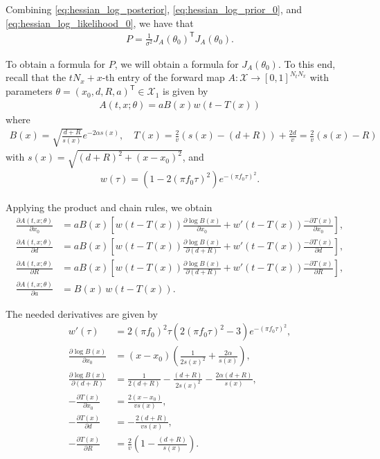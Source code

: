 \documentclass{homework}
\begin{document}
\begin{enumerate}
    Combining \eqref{eq:hessian_log_posterior}, \eqref{eq:hessian_log_prior_0}, and \eqref{eq:hessian_log_likelihood_0}, we have that
    \begin{align}
    P
    =
    \frac{1}{\sigma^2}J_A(\theta_0)^{\mathsf T}J_A(\theta_0). \label{eq:hessian_log_posterior_0}
    \end{align}

    To obtain a formula for \(P\), we will obtain a formula for $J_A(\theta_0)$. 
    To this end, recall that the $t N_x + x$-th entry of the forward map $A: \mathcal{X} \to [0, 1]^{N_t N_x}$ 
    with parameters $\theta=(x_0, d, R, a)^{\mathsf T} \in \mathcal{X}_1$ is given by 
    \begin{align*}
    A(t, x; \theta) = aB(x)w(t-T(x))
    \end{align*}
    where
    \begin{align*}
    B(x) = \sqrt{\frac{d+R}{s(x)}} e^{-2\alpha s(x)}, \quad T(x) = \frac{2}{v} (s(x) - (d+R)) + \frac{2d}{v} = \frac{2}{v} (s(x) - R)
    \end{align*}
    with $s(x) = \sqrt{(d+R)^2+(x-x_0)^2}$,
    and 
    \begin{align*}
    w(\tau) = (1-2(\pi f_0\tau)^2)e^{-(\pi f_0\tau)^2}.
    \end{align*}

    Applying the product and chain rules, we obtain
    \begin{equation}
    \begin{aligned}
    \frac{\partial A(t,x;\theta)}{\partial x_0}&=aB(x)\left[w(t-T(x))\frac{\partial\log B(x)}{\partial x_0}+w'(t-T(x))\frac{-\partial T(x)}{\partial x_0}\right],\\
    \frac{\partial A(t,x;\theta)}{\partial d}&=aB(x)\left[w(t-T(x))\frac{\partial\log B(x)}{\partial (d+R)}+w'(t-T(x))\frac{-\partial T(x)}{\partial d}\right],\\
    \frac{\partial A(t,x;\theta)}{\partial R}&=aB(x)\left[w(t-T(x))\frac{\partial\log B(x)}{\partial (d+R)}+w'(t-T(x))\frac{-\partial T(x)}{\partial R}\right],\\
    \frac{\partial A(t,x;\theta)}{\partial a}&=B(x)\,w(t-T(x)).
    \end{aligned}
    \label{eq:forward_map_partials}
    \end{equation}
    
    The needed derivatives are given by
    \begin{align*}
    w'(\tau)&=2(\pi f_0)^2\tau(2(\pi f_0\tau)^2-3)e^{-(\pi f_0\tau)^2},\\
    \frac{\partial\log B(x)}{\partial x_0}&=(x-x_0)\left(\frac{1}{2s(x)^2}+\frac{2\alpha}{s(x)}\right),\\
    \frac{\partial\log B(x)}{\partial (d+R)}&=\frac{1}{2(d+R)}-\frac{(d+R)}{2s(x)^2}-\frac{2\alpha (d+R)}{s(x)},\\
    -\frac{\partial T(x)}{\partial x_0}&=\frac{2(x-x_0)}{vs(x)},\\
    -\frac{\partial T(x)}{\partial d}&=-\frac{2(d+R)}{v s(x)},\\
    -\frac{\partial T(x)}{\partial R}&=\frac{2}{v}\left(1-\frac{(d+R)}{s(x)}\right).
    \end{align*}
    

\end{enumerate}
\end{document}
